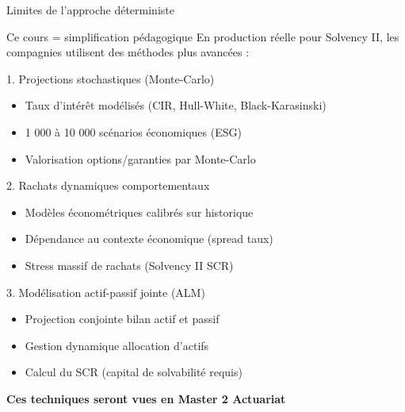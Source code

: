\documentclass[10pt,aspectratio=169]{beamer}
\begin{document}
\begin{frame}{Limites de l'approche déterministe}
\begin{alertblock}{Ce cours = simplification pédagogique}
En production réelle pour Solvency II, les compagnies utilisent des méthodes plus avancées :
\end{alertblock}

\begin{block}{1. Projections stochastiques (Monte-Carlo)}
\begin{itemize}
    \item Taux d'intérêt modélisés (CIR, Hull-White, Black-Karasinski)
    \item 1 000 à 10 000 scénarios économiques (ESG)
    \item Valorisation options/garanties par Monte-Carlo
\end{itemize}
\end{block}

\begin{block}{2. Rachats dynamiques comportementaux}
\begin{itemize}
    \item Modèles économétriques calibrés sur historique
    \item Dépendance au contexte économique (spread taux)
    \item Stress massif de rachats (Solvency II SCR)
\end{itemize}
\end{block}

\begin{block}{3. Modélisation actif-passif jointe (ALM)}
\begin{itemize}
    \item Projection conjointe bilan actif et passif
    \item Gestion dynamique allocation d'actifs
    \item Calcul du SCR (capital de solvabilité requis)
\end{itemize}
\end{block}

\textbf{Ces techniques seront vues en Master 2 Actuariat}
\end{frame}
\end{document}
